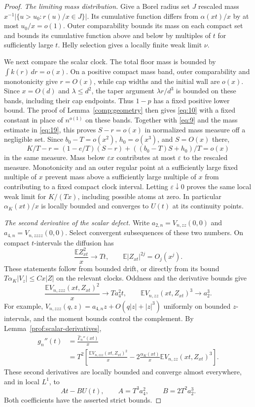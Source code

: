 \begin{proof}
\emph{The limiting mass distribution.}
Give a Borel radius set $J$ rescaled mass
$x^{-1}|\{u>u_0:r(u)/x\in J\}|$. Its cumulative function differs from
$\alpha(xt)/x$ by at most $u_0/x=o(1)$. Outer comparability bounds its
mass on each compact set and bounds its cumulative function above
and below by multiples of $t$ for sufficiently large $t$. Helly
selection gives a locally finite weak limit $\nu$.

We next compare the scalar clock. The total floor mass is bounded by
$\int k(r)\,dr=o(x)$. On a positive compact mass band, outer
comparability and monotonicity give $r=O(x)$, while cap widths and the
initial wall are $o(x)$. Since $x=O(d)$ and $\lambda\le d^2$, the
taper argument $\lambda r/d^3$ is bounded on these bands, including
their cap endpoints. Thus $1-p$ has a fixed positive lower bound.
The proof of Lemma~\ref{comp:geometry} then gives \eqref{eq:10}
with a fixed constant in place of $n^{o(1)}$ on these bands.
Together with \eqref{eq:9} and the mass estimate in \eqref{eq:19},
this proves $S-r=o(x)$ in normalized mass measure off a negligible
set. Since $b_0-T=o(x^2)$, $h_0=o(x^3)$, and $S=O(x)$ there,
\[
 K/T-r=(1-e/T)(S-r)+((b_0-T)S+h_0)/T=o(x)
\]
in the same measure. Mass below $\varepsilon x$ contributes at most
$\varepsilon$ to the rescaled measure. Monotonicity and an outer
regular point at a sufficiently large fixed multiple of $x$ prevent
mass above a sufficiently large multiple of $x$ from contributing
to a fixed compact clock interval. Letting $\varepsilon\downarrow0$
proves the same local weak limit for $K/(Tx)$, including possible
atoms at zero. In particular $\alpha_K(xt)/x$ is locally bounded
and converges to $U(t)$ at its continuity points.

\emph{The second derivative of the scalar defect.}
Write $a_{2,n}=V_{n,zz}(0,0)$ and $a_{4,n}=V_{n,zzzz}(0,0)$.
Select convergent subsequences of these two numbers. On compact
$t$-intervals the diffusion has
\[
 \frac{\mathbb E Z_{xt}^2}{x}\longrightarrow Tt,
 \qquad \mathbb E|Z_{xt}|^{2j}=O_j(x^j).
\]
These statements follow from bounded drift, or directly from its
bound $T\alpha_K|V_z|\le Cx|Z|$ on the relevant clocks. Oddness
and the derivative bounds give
\[
 \frac{\mathbb E V_{n,zzz}(xt,Z_{xt})^2}{x}
       \longrightarrow T a_4^2t,
 \qquad
 \mathbb E V_{n,zz}(xt,Z_{xt})^3\longrightarrow a_2^3.
\]
For example,
$V_{n,zzz}(q,z)=a_{4,n}z+O(q|z|+|z|^3)$ uniformly on bounded
$z$-intervals, and the moment bounds control the complement.
By Lemma~\ref{prof:scalar-derivatives},
\[
 \begin{aligned}
 g_n''(t)&=\frac{\widehat\Gamma_n''(xt)}x\\
 &=T^2\left[
 \frac{\mathbb E V_{n,zzz}(xt,Z_{xt})^2}{x}
 -2\frac{\alpha_K(xt)}x\mathbb E V_{n,zz}(xt,Z_{xt})^3\right].
 \end{aligned}
\]
These second derivatives are locally bounded and converge almost
everywhere, and in local $L^1$, to
\[
 At-BU(t),\qquad A=T^3a_4^2,\qquad B=2T^2a_2^3.
\]
Both coefficients have the asserted strict bounds.


\end{proof}
